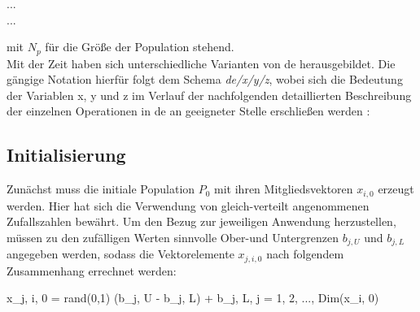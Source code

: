 		\begin{algorithm*}[H]
			\SetAlgoLined
			...\\
			...
		\end{algorithm*}
	
		mit $N_{p}$ für die Größe der Population stehend.\\
		Mit der Zeit haben sich unterschiedliche Varianten von \gls{de} herausgebildet. Die gängige Notation hierfür folgt dem Schema \textit{\gls{de}/x/y/z}, wobei sich die Bedeutung der Variablen x, y und z im Verlauf der nachfolgenden detaillierten Beschreibung der einzelnen Operationen in \gls{de} an geeigneter Stelle erschließen werden \cite{storn-price-de, storn-price-de-book}: 
		
		\subsection{Initialisierung}
		\label{sec:de-init}
		
			Zunächst muss die initiale Population $P_{0}$ mit ihren Mitgliedsvektoren $x_{i, 0}$ erzeugt werden. Hier hat sich die Verwendung von gleich-verteilt angenommenen Zufallszahlen bewährt. Um den Bezug zur jeweiligen Anwendung herzustellen, müssen zu den zufälligen Werten sinnvolle Ober-und Untergrenzen $b_{j, U}$ und $b_{j, L}$ angegeben werden, sodass die Vektorelemente $x_{j, i, 0}$ nach folgendem Zusammenhang errechnet werden:
			\begin{flalign}
				x_{j, i, 0} = rand(0,1) \cdot (b_{j, U} - b_{j, L}) + b_{j, L}, \quad j = 1, 2, ..., Dim(x_{i, 0}) \label{eq:de-init}
			\end{flalign}  
			

